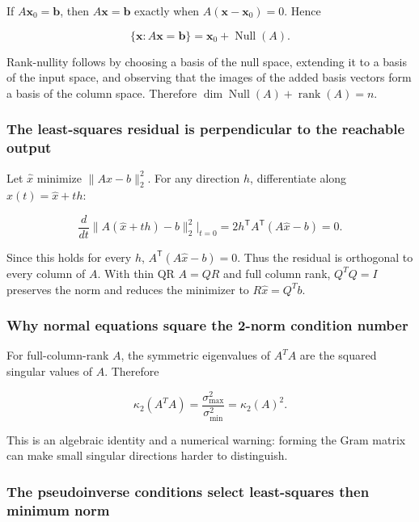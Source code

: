 If \(A\mathbf x_0=\mathbf b\), then \(A\mathbf x=\mathbf b\) exactly when \(A(\mathbf x-\mathbf x_0)=0\). Hence

\[
\{\mathbf x:A\mathbf x=\mathbf b\}=\mathbf x_0+\operatorname{Null}(A).
\]

Rank-nullity follows by choosing a basis of the null space, extending it to a basis of the input space, and observing that the images of the added basis vectors form a basis of the column space. Therefore \(\dim\operatorname{Null}(A)+\operatorname{rank}(A)=n\).

\subsubsection{The least-squares residual is perpendicular to the reachable output}\label{02-foundations-ii-ch039-the-least-squares-residual-is-perpendicular-to-the-reachable-output}

Let \(\widehat x\) minimize \(\|Ax-b\|_2^2\). For any direction \(h\), differentiate along \(x(t)=\widehat x+th\):

\[
\frac{d}{dt}\|A(\widehat x+th)-b\|_2^2\bigg|_{t=0}
=2h^\mathsf T A^\mathsf T(A\widehat x-b)=0.
\]

Since this holds for every \(h\), \(A^\mathsf T(A\widehat x-b)=0\). Thus the residual is orthogonal to every column of \(A\). With thin QR \(A=QR\) and full column rank, \(Q^TQ=I\) preserves the norm and reduces the minimizer to \(R\widehat x=Q^Tb\).

\subsubsection{Why normal equations square the 2-norm condition number}\label{02-foundations-ii-ch039-why-normal-equations-square-the-2-norm-condition-number}

For full-column-rank \(A\), the symmetric eigenvalues of \(A^TA\) are the squared singular values of \(A\). Therefore

\[
\kappa_2(A^TA)=\frac{\sigma_{\max}^2}{\sigma_{\min}^2}=\kappa_2(A)^2.
\]

This is an algebraic identity and a numerical warning: forming the Gram matrix can make small singular directions harder to distinguish.

\subsubsection{The pseudoinverse conditions select least-squares then minimum norm}\label{02-foundations-ii-ch039-the-pseudoinverse-conditions-select-least-squares-then-minimum-norm}

